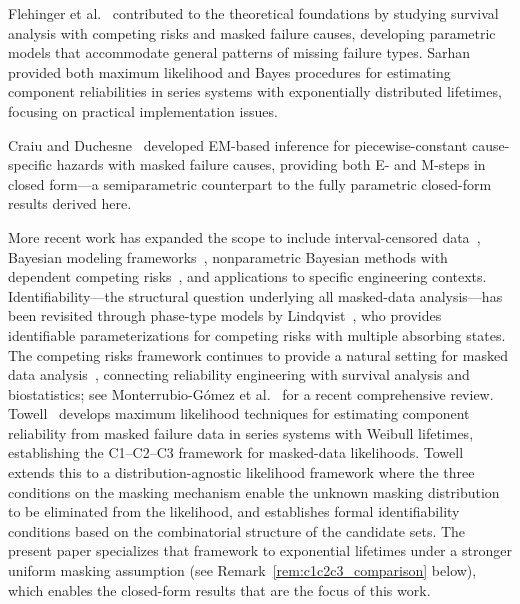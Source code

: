 \documentclass[12pt]{article}
\theoremstyle{definition}
\theoremstyle{remark}
\begin{document}
Flehinger et al.~\cite{flehinger1998,flehinger2002} contributed to the theoretical foundations by studying survival analysis with competing risks and masked failure causes, developing parametric models that accommodate general patterns of missing failure types. Sarhan~\cite{sarhan2001} provided both maximum likelihood and Bayes procedures for estimating component reliabilities in series systems with exponentially distributed lifetimes, focusing on practical implementation issues.

Craiu and Duchesne~\cite{craiu2004} developed EM-based inference for piecewise-constant cause-specific hazards with masked failure causes, providing both E- and M-steps in closed form---a semiparametric counterpart to the fully parametric closed-form results derived here.

More recent work has expanded the scope to include interval-censored data~\cite{reliability}, Bayesian modeling frameworks~\cite{kuo2007}, nonparametric Bayesian methods with dependent competing risks~\cite{liu2021}, and applications to specific engineering contexts. Identifiability---the structural question underlying all masked-data analysis---has been revisited through phase-type models by Lindqvist~\cite{lindqvist2023}, who provides identifiable parameterizations for competing risks with multiple absorbing states. The competing risks framework continues to provide a natural setting for masked data analysis~\cite{agustin}, connecting reliability engineering with survival analysis and biostatistics; see Monterrubio-G\'omez et al.~\cite{monterrubio2024} for a recent comprehensive review. Towell~\cite{towell2023reliability} develops maximum likelihood techniques for estimating component reliability from masked failure data in series systems with Weibull lifetimes, establishing the C1--C2--C3 framework for masked-data likelihoods. Towell~\cite{towell2025masked} extends this to a distribution-agnostic likelihood framework where the three conditions on the masking mechanism enable the unknown masking distribution to be eliminated from the likelihood, and establishes formal identifiability conditions based on the combinatorial structure of the candidate sets. The present paper specializes that framework to exponential lifetimes under a stronger uniform masking assumption (see Remark~\ref{rem:c1c2c3_comparison} below), which enables the closed-form results that are the focus of this work.
\end{document}
